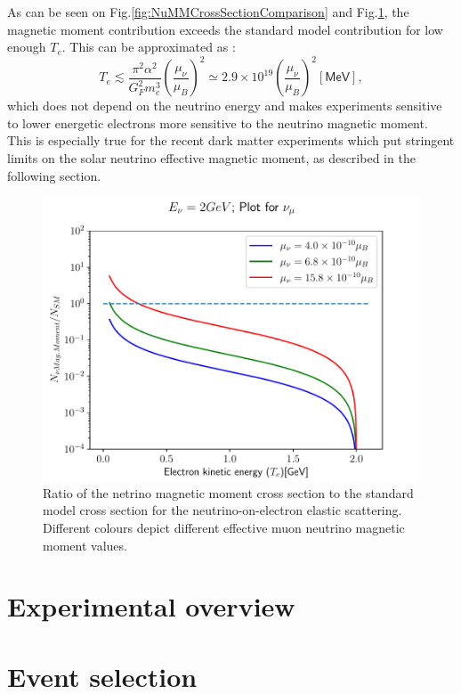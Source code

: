 As can be seen on Fig.\ref{fig:NuMMCrossSectionComparison} and Fig.\ref{fig:NuMMCrossSectionRatios}, the magnetic moment contribution exceeds the standard model contribution for low enough $T_e$. This can be approximated as \cite{nuElmagInt2015.pdf}:
\begin{equation}
T_e\lesssim\frac{\pi^2\alpha^2}{G_F^2m_e^3}\left(\frac{\mu_{\nu}}{\mu_B}\right)^2\simeq 2.9\times 10^{19}\left(\frac{\mu_{\nu}}{\mu_B}\right)^2\left[\textsf{MeV}\right],
\end{equation}
which does not depend on the neutrino energy and makes experiments sensitive to lower energetic electrons more sensitive to the neutrino magnetic moment. This is especially true for the recent dark matter experiments which put stringent limits on the solar neutrino effective magnetic moment, as described in the following section.

\begin{figure}[hbtp]
\centering
\includegraphics[width=.7\textwidth]{Plots/NuMM/RatioNumuMMCompLinX.pdf}
\caption{Ratio of the netrino magnetic moment cross section to the standard model cross section for the neutrino-on-electron elastic scattering. Different colours depict different effective muon neutrino magnetic moment values.}
\label{fig:NuMMCrossSectionRatios}
\end{figure}


\section{Experimental overview}


\section{Event selection}

